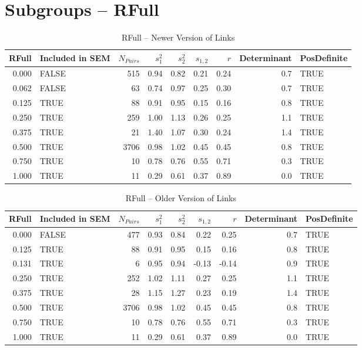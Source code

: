 \documentclass{article}\usepackage{graphicx, color}
\begin{document}
\section{Subgroups --  RFull }%
\begin{table}[ht]
\centering
\begin{tabular}{rlrrrrrrl}
  \hline
RFull & Included in SEM & $N_{Pairs}$ & $s_1^2$ & $s_2^2$ & $s_{1,2}$ & $r$ & Determinant & PosDefinite \\ 
  \hline
0.000 & FALSE & 515 & 0.94 & 0.82 & 0.21 & 0.24 & 0.7 & TRUE \\ 
  0.062 & FALSE & 63 & 0.74 & 0.97 & 0.25 & 0.30 & 0.7 & TRUE \\ 
  0.125 & TRUE & 88 & 0.91 & 0.95 & 0.15 & 0.16 & 0.8 & TRUE \\ 
  0.250 & TRUE & 259 & 1.00 & 1.13 & 0.26 & 0.25 & 1.1 & TRUE \\ 
  0.375 & TRUE & 21 & 1.40 & 1.07 & 0.30 & 0.24 & 1.4 & TRUE \\ 
  0.500 & TRUE & 3706 & 0.98 & 1.02 & 0.45 & 0.45 & 0.8 & TRUE \\ 
  0.750 & TRUE & 10 & 0.78 & 0.76 & 0.55 & 0.71 & 0.3 & TRUE \\ 
  1.000 & TRUE & 11 & 0.29 & 0.61 & 0.37 & 0.89 & 0.0 & TRUE \\ 
   \hline
\end{tabular}
\caption{RFull -- Newer Version of Links} 
\end{table}
\begin{table}[ht]
\centering
\begin{tabular}{rlrrrrrrl}
  \hline
RFull & Included in SEM & $N_{Pairs}$ & $s_1^2$ & $s_2^2$ & $s_{1,2}$ & $r$ & Determinant & PosDefinite \\ 
  \hline
0.000 & FALSE & 477 & 0.93 & 0.84 & 0.22 & 0.25 & 0.7 & TRUE \\ 
  0.125 & TRUE & 88 & 0.91 & 0.95 & 0.15 & 0.16 & 0.8 & TRUE \\ 
  0.131 & TRUE & 6 & 0.95 & 0.94 & -0.13 & -0.14 & 0.9 & TRUE \\ 
  0.250 & TRUE & 252 & 1.02 & 1.11 & 0.27 & 0.25 & 1.1 & TRUE \\ 
  0.375 & TRUE & 28 & 1.15 & 1.27 & 0.23 & 0.19 & 1.4 & TRUE \\ 
  0.500 & TRUE & 3706 & 0.98 & 1.02 & 0.45 & 0.45 & 0.8 & TRUE \\ 
  0.750 & TRUE & 10 & 0.78 & 0.76 & 0.55 & 0.71 & 0.3 & TRUE \\ 
  1.000 & TRUE & 11 & 0.29 & 0.61 & 0.37 & 0.89 & 0.0 & TRUE \\ 
   \hline
\end{tabular}
\caption{RFull -- Older Version of Links} 
\end{table}
\end{document}
